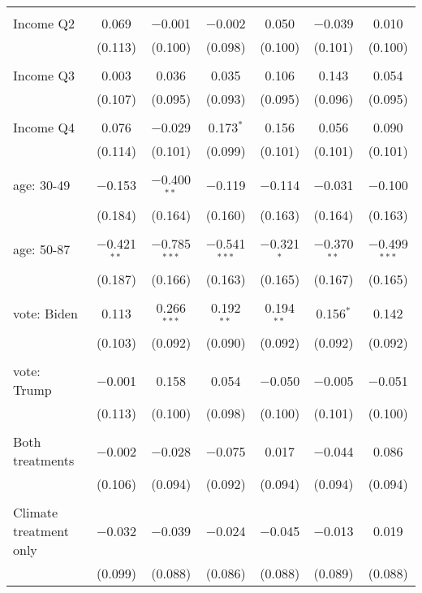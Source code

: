 \begin{tabular}{@{\extracolsep{5pt}}lcccccc}
  & & & & & & \\ 
 Income Q2 & 0.069 & $-$0.001 & $-$0.002 & 0.050 & $-$0.039 & 0.010 \\ 
  & (0.113) & (0.100) & (0.098) & (0.100) & (0.101) & (0.100) \\ 
  & & & & & & \\ 
 Income Q3 & 0.003 & 0.036 & 0.035 & 0.106 & 0.143 & 0.054 \\ 
  & (0.107) & (0.095) & (0.093) & (0.095) & (0.096) & (0.095) \\ 
  & & & & & & \\ 
 Income Q4 & 0.076 & $-$0.029 & 0.173$^{*}$ & 0.156 & 0.056 & 0.090 \\ 
  & (0.114) & (0.101) & (0.099) & (0.101) & (0.101) & (0.101) \\ 
  & & & & & & \\ 
 age: 30-49 & $-$0.153 & $-$0.400$^{**}$ & $-$0.119 & $-$0.114 & $-$0.031 & $-$0.100 \\ 
  & (0.184) & (0.164) & (0.160) & (0.163) & (0.164) & (0.163) \\ 
  & & & & & & \\ 
 age: 50-87 & $-$0.421$^{**}$ & $-$0.785$^{***}$ & $-$0.541$^{***}$ & $-$0.321$^{*}$ & $-$0.370$^{**}$ & $-$0.499$^{***}$ \\ 
  & (0.187) & (0.166) & (0.163) & (0.165) & (0.167) & (0.165) \\ 
  & & & & & & \\ 
 vote: Biden & 0.113 & 0.266$^{***}$ & 0.192$^{**}$ & 0.194$^{**}$ & 0.156$^{*}$ & 0.142 \\ 
  & (0.103) & (0.092) & (0.090) & (0.092) & (0.092) & (0.092) \\ 
  & & & & & & \\ 
 vote: Trump & $-$0.001 & 0.158 & 0.054 & $-$0.050 & $-$0.005 & $-$0.051 \\ 
  & (0.113) & (0.100) & (0.098) & (0.100) & (0.101) & (0.100) \\ 
  & & & & & & \\ 
 Both treatments & $-$0.002 & $-$0.028 & $-$0.075 & 0.017 & $-$0.044 & 0.086 \\ 
  & (0.106) & (0.094) & (0.092) & (0.094) & (0.094) & (0.094) \\ 
  & & & & & & \\ 
 Climate treatment only & $-$0.032 & $-$0.039 & $-$0.024 & $-$0.045 & $-$0.013 & 0.019 \\ 
  & (0.099) & (0.088) & (0.086) & (0.088) & (0.089) & (0.088) \\ 

\end{tabular}
